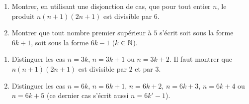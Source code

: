 \documentclass[11pt,class=report,crop=false]{standalone}
\begin{document}


\bigskip
\bigskip



\exercice{}
\sauteligne
\begin{enumerate}
    \item Montrer, en utilisant une disjonction de cas, que pour tout entier $n$, le produit $n(n+1)(2n+1)$ est divisible par $6$.
    
    \item Montrer que tout nombre premier supérieur à $5$ s'écrit soit sous la forme $6k+1$, soit sous la forme $6k-1$ ($k \in \mathbb{N}$).
\end{enumerate}
\finenonce

\indication
\sauteligne
\begin{enumerate}
    \item Distinguer les cas $n=3k$, $n=3k+1$ ou $n=3k+2$. Il faut montrer que $n(n+1)(2n+1)$ est divisible par $2$ et par $3$.
    
    \item Distinguer les cas $n=6k$, $n=6k+1$, $n=6k+2$, $n=6k+3$, $n=6k+4$ ou $n=6k+5$ (ce dernier cas s'écrit aussi $n=6k'-1$). 
\end{enumerate}
\finindication
\end{document}
